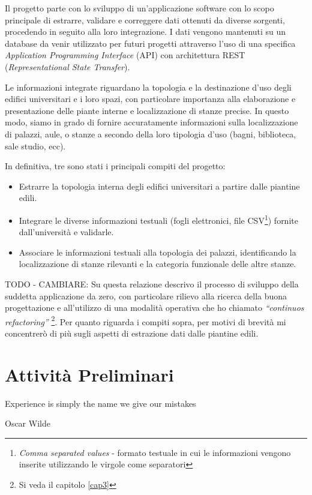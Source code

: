 \documentclass[12pt]{report}
\begin{document}
Il progetto parte con lo sviluppo di un'applicazione software con lo scopo principale di estrarre, validare e correggere dati ottenuti da diverse sorgenti, procedendo in seguito alla loro integrazione. I dati vengono mantenuti su un database da venir utilizzato per futuri progetti attraverso l'uso di una specifica 
\textit{Application Programming Interface} (API) con architettura REST 
(\textit{Representational State Transfer}). 

Le informazioni integrate riguardano la topologia e la destinazione d'uso degli edifici universitari e i loro spazi, con particolare importanza alla elaborazione e presentazione delle piante interne e localizzazione di stanze precise. In questo modo, siamo in grado di fornire accuratamente informazioni sulla localizzazione di palazzi, aule, o stanze a secondo della loro tipologia d'uso (bagni, biblioteca, sale studio, ecc).

In definitiva, tre sono stati i principali compiti del progetto:
\begin{itemize}
  \item Estrarre la topologia interna degli edifici universitari a partire dalle piantine edili.
  \item Integrare le diverse informazioni testuali (fogli elettronici, file CSV\footnote{\textit{Comma separated values} - formato testuale in cui le informazioni vengono inserite utilizzando le virgole come separatori}) fornite dall'università e validarle.
  \item Associare le informazioni testuali alla topologia dei palazzi, identificando la localizzazione di stanze rilevanti e la categoria funzionale delle altre stanze.
\end{itemize}


TODO - CAMBIARE:
Su questa relazione descrivo il processo di sviluppo della suddetta applicazione da zero, con particolare rilievo alla ricerca della buona progettazione e all'utilizzo di una modalità operativa che ho chiamato \textit{“continuos refactoring”} \footnote{Si veda il capitolo \ref{cap3}}. Per quanto riguarda i compiti sopra, per motivi di brevità mi concentrerò di più sugli aspetti di estrazione dati dalle piantine edili.

% 
% 
\chapter{Attività Preliminari}
\label{cap2}

\epigraph{Experience is simply the name we give our mistakes}{Oscar Wilde}
\end{document}
